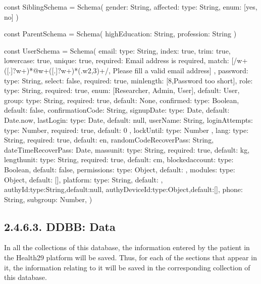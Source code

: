 \documentclass[letterpaper,10pt,english]{sphinxmanual}
\begin{document}
\begin{sphinxVerbatim}[commandchars=\\\{\}]
const SiblingSchema = Schema(\PYGZob{}
	gender: String,
	affected: \PYGZob{} type: String, enum: [\PYGZsq{}yes\PYGZsq{}, \PYGZsq{}no\PYGZsq{}]\PYGZcb{}
\PYGZcb{})

const ParentSchema = Schema(\PYGZob{}
	highEducation: String,
	profession: String
\PYGZcb{})

const UserSchema = Schema(\PYGZob{}
	email: \PYGZob{}
		type: String,
		index: true,
		trim: true,
		lowercase: true,
		unique: true,
		required: \PYGZsq{}Email address is required\PYGZsq{},
        match: [/\PYGZca{}\PYGZbs{}w+([\PYGZbs{}.\PYGZhy{}]?\PYGZbs{}w+)*@\PYGZbs{}w+([\PYGZbs{}.\PYGZhy{}]?\PYGZbs{}w+)*(\PYGZbs{}.\PYGZbs{}w\PYGZob{}2,3\PYGZcb{})+\PYGZdl{}/, \PYGZsq{}Please fill a valid email address\PYGZsq{}]
    \PYGZcb{},
	password: \PYGZob{} type: String, select: false, required: true, minlength: [8,\PYGZsq{}Password too short\PYGZsq{}]\PYGZcb{},
	role: \PYGZob{} type: String, required: true, enum: [\PYGZsq{}Researcher\PYGZsq{}, \PYGZsq{}Admin\PYGZsq{}, \PYGZsq{}User\PYGZsq{}], default: \PYGZsq{}User\PYGZsq{}\PYGZcb{},
	group: \PYGZob{} type: String, required: true, default: \PYGZsq{}None\PYGZsq{}\PYGZcb{},
	confirmed: \PYGZob{}type: Boolean, default: false\PYGZcb{},
	confirmationCode: String,
	signupDate: \PYGZob{}type: Date, default: Date.now\PYGZcb{},
	lastLogin: \PYGZob{}type: Date, default: null\PYGZcb{},
	userName: String,
	loginAttempts: \PYGZob{} type: Number, required: true, default: 0 \PYGZcb{},
  	lockUntil: \PYGZob{} type: Number \PYGZcb{},
	lang: \PYGZob{} type: String, required: true, default: \PYGZsq{}en\PYGZsq{}\PYGZcb{},
	randomCodeRecoverPass: String,
	dateTimeRecoverPass: Date,
	massunit: \PYGZob{} type: String, required: true, default: \PYGZsq{}kg\PYGZsq{}\PYGZcb{},
	lengthunit: \PYGZob{} type: String, required: true, default: \PYGZsq{}cm\PYGZsq{}\PYGZcb{},
	blockedaccount: \PYGZob{}type: Boolean, default: false\PYGZcb{},
	permissions: \PYGZob{}type: Object, default: \PYGZob{}\PYGZcb{}\PYGZcb{},
	modules: \PYGZob{}type: Object, default: []\PYGZcb{},
	platform: \PYGZob{}type: String, default: \PYGZsq{}\PYGZsq{}\PYGZcb{},
	authyId:\PYGZob{}type:String,default:null\PYGZcb{},
	authyDeviceId:\PYGZob{}type:Object,default:[]\PYGZcb{},
	phone: String,
	subgroup: Number,
\PYGZcb{})
\end{sphinxVerbatim}


\subsection{2.4.6.3. DDBB: Data}
\label{\detokenize{pages/SW/Code:ddbb-data}}
In all the collections of this database, the information entered by the patient in the Health29 platform will be saved. Thus, for each of the sections that appear in it, the information relating to it will be saved in the corresponding collection of this database.
\end{document}

